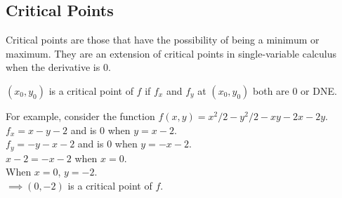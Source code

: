 \subsection{Critical Points}
\noindent
Critical points are those that have the possibility of being a minimum or maximum. They are an extension of critical points in single-variable calculus when the derivative is 0.\\

\noindent
\begin{definition}
	$(x_0,y_0)$ is a critical point of $f$ if $f_x$ and $f_y$ at $(x_0,y_0)$ both are 0 or DNE.
\end{definition}

\noindent
For example, consider the function $f(x,y)=x^2/2-y^2/2-xy-2x-2y$.\\
\indent
$f_x=x-y-2$ and is 0 when $y=x-2$.\\
\indent
$f_y=-y-x-2$ and is 0 when $y=-x-2$.\\
\indent
$x-2=-x-2$ when $x=0$.\\
\indent
When $x=0$, $y=-2$.\\
\indent
$\implies (0,-2)$ is a critical point of $f$.

